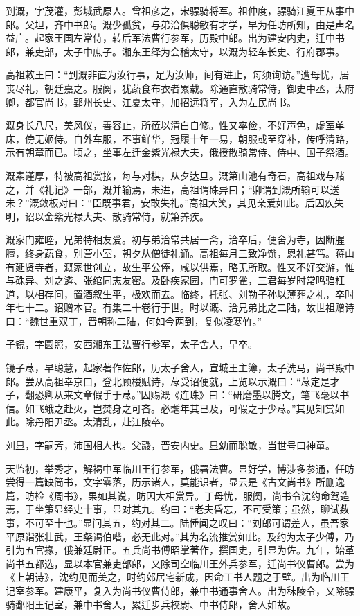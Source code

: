 \documentclass[12pt,UTF8]{ctexbook}
\begin{document}
到溉，字茂灌，彭城武原人。曾祖彦之，宋骠骑将军。祖仲度，骠骑江夏王从事中郎。父坦，齐中书郎。溉少孤贫，与弟洽俱聪敏有才学，早为任昉所知，由是声名益广。起家王国左常侍，转后军法曹行参军，历殿中郎。出为建安内史，迁中书郎，兼吏部，太子中庶子。湘东王绎为会稽太守，以溉为轻车长史、行府郡事。

高祖敕王曰：“到溉非直为汝行事，足为汝师，间有进止，每须询访。”遭母忧，居丧尽礼，朝廷嘉之。服阕，犹蔬食布衣者累载。除通直散骑常侍，御史中丞，太府卿，都官尚书，郢州长史、江夏太守，加招远将军，入为左民尚书。

溉身长八尺，美风仪，善容止，所莅以清白自修。性又率俭，不好声色，虚室单床，傍无姬侍。自外车服，不事鲜华，冠履十年一易，朝服或至穿补，传呼清路，示有朝章而已。顷之，坐事左迁金紫光禄大夫，俄授散骑常侍、侍中、国子祭酒。

溉素谨厚，特被高祖赏接，每与对棋，从夕达旦。溉第山池有奇石，高祖戏与赌之，并《礼记》一部，溉并输焉，未进，高祖谓硃异曰；“卿谓到溉所输可以送未？”溉敛板对曰：“臣既事君，安敢失礼。”高祖大笑，其见亲爱如此。后因疾失明，诏以金紫光禄大夫、散骑常侍，就第养疾。

溉家门雍睦，兄弟特相友爱。初与弟洽常共居一斋，洽卒后，便舍为寺，因断腥膻，终身蔬食，别营小室，朝夕从僧徒礼诵。高祖每月三致净馔，恩礼甚笃。蒋山有延贤寺者，溉家世创立，故生平公俸，咸以供焉，略无所取。性又不好交游，惟与硃异、刘之遴、张绾同志友密。及卧疾家园，门可罗雀，三君每岁时常鸣驺枉道，以相存问，置酒叙生平，极欢而去。临终，托张、刘勒子孙以薄葬之礼，卒时年七十二。诏赠本官。有集二十卷行于世。时以溉、洽兄弟比之二陆，故世祖赠诗曰：“魏世重双丁，晋朝称二陆，何如今两到，复似凌寒竹。”

子镜，字圆照，安西湘东王法曹行参军，太子舍人，早卒。

镜子荩，早聪慧，起家著作佐郎，历太子舍人，宣城王主簿，太子洗马，尚书殿中郎。尝从高祖幸京口，登北顾楼赋诗，荩受诏便就，上览以示溉曰：“荩定是才子，翻恐卿从来文章假手于荩。”因赐溉《连珠》曰：“研磨墨以腾文，笔飞毫以书信。如飞蛾之赴火，岂焚身之可吝。必耄年其已及，可假之于少荩。”其见知赏如此。除丹阳尹丞。太清乱，赴江陵卒。

刘显，字嗣芳，沛国相人也。父鬷，晋安内史。显幼而聪敏，当世号曰神童。

天监初，举秀才，解褐中军临川王行参军，俄署法曹。显好学，博涉多参通，任昉尝得一篇缺简书，文字零落，历示诸人，莫能识者，显云是《古文尚书》所删逸篇，昉检《周书》，果如其说，昉因大相赏异。丁母忧，服阕，尚书令沈约命驾造焉，于坐策显经史十事，显对其九。约曰：“老夫昏忘，不可受策；虽然，聊试数事，不可至十也。”显问其五，约对其二。陆倕闻之叹曰：“刘郎可谓差人，虽吾家平原诣张壮武，王粲谒伯喈，必无此对。”其为名流推赏如此。及约为太子少傅，乃引为五官掾，俄兼廷尉正。五兵尚书傅昭掌著作，撰国史，引显为佐。九年，始革尚书五都选，显以本官兼吏部郎，又除司空临川王外兵参军，迁尚书仪曹郎。尝为《上朝诗》，沈约见而美之，时约郊居宅新成，因命工书人题之于壁。出为临川王记室参军。建康平，复入为尚书仪曹侍郎，兼中书通事舍人。出为秣陵令，又除骠骑鄱阳王记室，兼中书舍人，累迁步兵校尉、中书侍郎，舍人如故。
\end{document}
